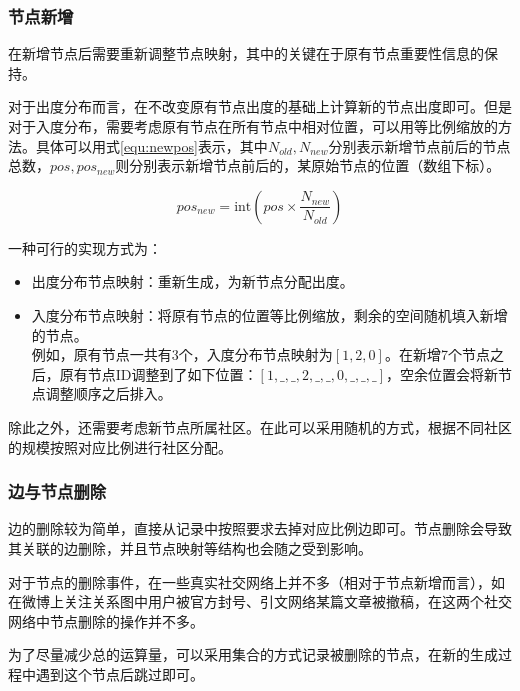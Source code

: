 \vspace{0.2cm}

\subsubsection{节点新增}

在新增节点后需要重新调整节点映射，其中的关键在于原有节点重要性信息的保持。

对于出度分布而言，在不改变原有节点出度的基础上计算新的节点出度即可。但是对于入度分布，需要考虑原有节点在所有节点中相对位置，可以用等比例缩放的方法。具体可以用式\ref{equ:newpos}表示，其中$N_{old}, N_{new}$分别表示新增节点前后的节点总数，$pos, pos_{new}$则分别表示新增节点前后的，某原始节点的位置（数组下标）。

\begin{equation}
  \label{equ:newpos}
  pos_{new} = \text{int}\left(pos\times \frac{N_{new}}{N_{old}}\right)
\end{equation}

一种可行的实现方式为：

\begin{itemize}
  \item 出度分布节点映射：重新生成，为新节点分配出度。
  \item 入度分布节点映射：将原有节点的位置等比例缩放，剩余的空间随机填入新增的节点。\\
  例如，原有节点一共有3个，入度分布节点映射为$[1,2,0]$。在新增7个节点之后，原有节点ID调整到了如下位置：$[1,\_,\_,2,\_,\_,0,\_,\_,\_]$，空余位置会将新节点调整顺序之后排入。
\end{itemize}

\vspace{0.2cm}

除此之外，还需要考虑新节点所属社区。在此可以采用随机的方式，根据不同社区的规模按照对应比例进行社区分配。

\subsubsection{边与节点删除}

边的删除较为简单，直接从记录中按照要求去掉对应比例边即可。节点删除会导致其关联的边删除，并且节点映射等结构也会随之受到影响。

对于节点的删除事件，在一些真实社交网络上并不多（相对于节点新增而言），如在微博上关注关系图中用户被官方封号、引文网络某篇文章被撤稿，在这两个社交网络中节点删除的操作并不多。

为了尽量减少总的运算量，可以采用集合的方式记录被删除的节点，在新的生成过程中遇到这个节点后跳过即可。

